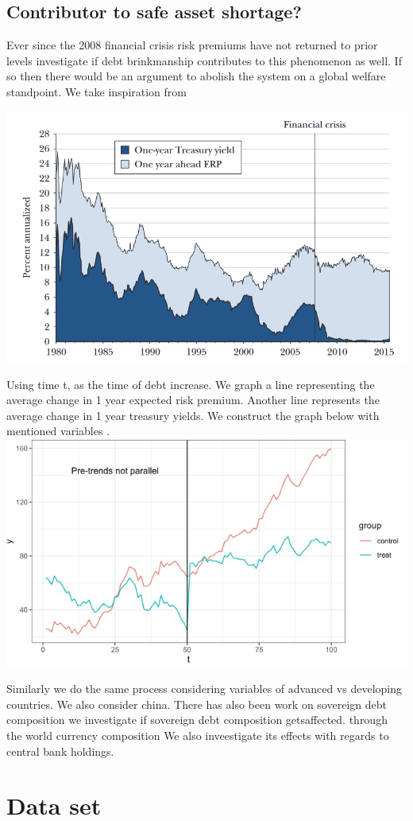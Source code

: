\documentclass[
  12pt]{article}
\begin{document}
\hypertarget{contributor-to-safe-asset-shortage}{%
\subsection{Contributor to safe asset
shortage?}\label{contributor-to-safe-asset-shortage}}

Ever since the 2008 financial crisis risk premiums have not returned to
prior levels \citet{caballero2017.We} investigate if debt brinkmanship
contributes to this phenomenon as well. If so then there would be an
argument to abolish the system on a global welfare standpoint. We take
inspiration from

\includegraphics{style-guide/1_year_ERP.png}

Using time t, as the time of debt increase. We graph a line representing
the average change in 1 year expected risk premium. Another line
represents the average change in 1 year treasury yields. We construct
the graph below with mentioned variables
\citet{duarte2015}.\includegraphics{style-guide/1_year_ERP_parallel_trends.jpeg}

Similarly we do the same process considering variables of advanced vs
developing countries. We also consider china. There has also been work
on sovereign debt composition we investigate if sovereign debt
composition getsaffected. through the world currency composition We also
inveestigate its effects with regards to central bank holdings.

\hypertarget{sec-dataset}{%
\section{Data set}\label{sec-dataset}}


\renewcommand\refname{References}
  
\end{document}
